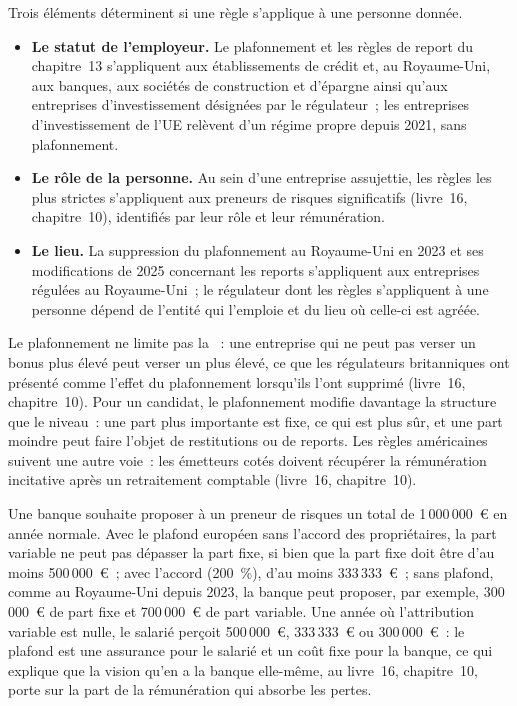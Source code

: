 Trois éléments déterminent si une règle s'applique à une personne donnée.
\begin{itemize}
\item \textbf{Le statut de l'employeur.} Le plafonnement et les règles de report du chapitre~13 s'appliquent aux établissements de crédit et, au Royaume-Uni,
aux banques, aux sociétés de construction et d'épargne ainsi qu'aux entreprises d'investissement désignées par le régulateur~; les entreprises d'investissement de l'UE relèvent
d'un régime propre depuis 2021, sans plafonnement.
\item \textbf{Le rôle de la personne.} Au sein d'une entreprise assujettie, les règles les plus strictes s'appliquent aux preneurs de risques significatifs (livre~16,
chapitre~10), identifiés par leur rôle et leur rémunération.
\item \textbf{Le lieu.} La suppression du plafonnement au Royaume-Uni en 2023 et ses modifications de 2025 concernant les reports s'appliquent aux entreprises régulées au Royaume-Uni~;
le régulateur dont les règles s'appliquent à une personne dépend de l'entité qui l'emploie et du lieu où celle-ci est agréée.
\end{itemize}
Le plafonnement ne limite pas la ~: une entreprise qui ne peut pas verser un bonus plus élevé peut verser un  plus élevé, ce que les régulateurs britanniques
ont présenté comme l'effet du plafonnement lorsqu'ils l'ont supprimé (livre~16, chapitre~10). Pour un candidat, le plafonnement modifie davantage la structure que le niveau~:
une part plus importante est fixe, ce qui est plus sûr, et une part moindre peut faire l'objet de restitutions ou de reports. Les règles américaines suivent une autre voie~:
les émetteurs cotés doivent récupérer la rémunération incitative après un retraitement comptable (livre~16, chapitre~10).

\begin{example}\label{ex:in:pay-regulation-and-tax-by-location:mix}
Une banque souhaite proposer à un preneur de risques un total de 1\,000\,000~\euro{} en année normale. Avec le plafond européen sans l'accord des propriétaires, la
part variable ne peut pas dépasser la part fixe, si bien que la part fixe doit être d'au moins 500\,000~\euro{}~; avec l'accord (200~\%), d'au moins
333\,333~\euro{}~; sans plafond, comme au Royaume-Uni depuis 2023, la banque peut proposer, par exemple, 300\,000~\euro{} de part fixe et 700\,000~\euro{} de part
variable. Une année où l'attribution variable est nulle, le salarié perçoit 500\,000~\euro{}, 333\,333~\euro{} ou 300\,000~\euro{}~: le plafond est une assurance
pour le salarié et un coût fixe pour la banque, ce qui explique que la vision qu'en a la banque elle-même, au livre~16,
chapitre~10, porte sur la part de la rémunération qui absorbe les pertes.
\end{example}


